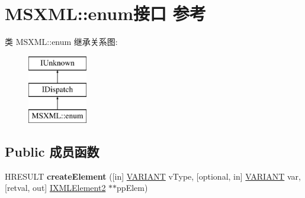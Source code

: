 \hypertarget{interface_m_s_x_m_l_1_1enum}{}\section{M\+S\+X\+ML\+:\+:enum接口 参考}
\label{interface_m_s_x_m_l_1_1enum}
类 M\+S\+X\+ML\+:\+:enum 继承关系图\+:\begin{figure}[H]
\begin{center}
\leavevmode
\includegraphics[height=3.000000cm]{interface_m_s_x_m_l_1_1enum}
\end{center}
\end{figure}
\subsection*{Public 成员函数}
\begin{DoxyCompactItemize}
\item 
\mbox{\label{interface_m_s_x_m_l_1_1enum_aba6c808df8692b012dd670e1bb622334}} 
H\+R\+E\+S\+U\+LT {\bfseries create\+Element} (\mbox{[}in\mbox{]} \hyperlink{structtag_v_a_r_i_a_n_t}{V\+A\+R\+I\+A\+NT} v\+Type, \mbox{[}optional, in\mbox{]} \hyperlink{structtag_v_a_r_i_a_n_t}{V\+A\+R\+I\+A\+NT} var, \mbox{[}retval, out\mbox{]} \hyperlink{interface_m_s_x_m_l_1_1_i_x_m_l_element2}{I\+X\+M\+L\+Element2} $\ast$$\ast$pp\+Elem)
\end{DoxyCompactItemize}
